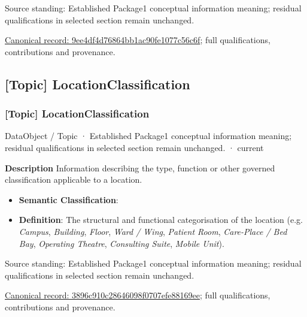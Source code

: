 Source standing: Established Package1 conceptual information meaning; residual qualifications in selected section remain unchanged.


{\footnotesize \href{../../../../continuum/application/data-object/topic/9ee4df4d76864bb1ac90fe1077c56c6f.md}{Canonical record: 9ee4df4d76864bb1ac90fe1077c56c6f}; full qualifications, contributions and provenance.}\par
\subsection{[Topic] LocationClassification}

\subsubsection{[Topic] LocationClassification}

\label{element:3896c910c28646098f0707efe88169ee}
{\small DataObject / Topic · Established Package1 conceptual information meaning; residual qualifications in selected section remain unchanged. · current}\par

\textbf{Description}
Information describing the type, function or other governed classification applicable to a location.



\begin{itemize}


\item \textbf{Semantic Classification}: \texttt{}

\item \textbf{Definition}: The structural and functional categorisation of the location (e.g. \emph{Campus}, \emph{Building}, \emph{Floor}, \emph{Ward / Wing}, \emph{Patient Room}, \emph{Care-Place / Bed Bay}, \emph{Operating Theatre}, \emph{Consulting Suite}, \emph{Mobile Unit}).

\end{itemize}


Source standing: Established Package1 conceptual information meaning; residual qualifications in selected section remain unchanged.


{\footnotesize \href{../../../../continuum/application/data-object/topic/3896c910c28646098f0707efe88169ee.md}{Canonical record: 3896c910c28646098f0707efe88169ee}; full qualifications, contributions and provenance.}\par
